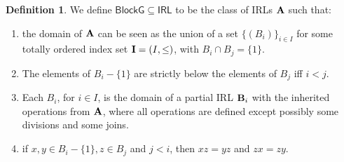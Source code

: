 \documentclass{amsart}
\theoremstyle{definition}
\newtheorem{definition}[theorem]{Definition}
\numberwithin{equation}{section}
\newcommand{\alg}[1]{{\textbf{\upshape #1}}}  %
\newcommand{\vv}[1]{\mathsf {#1}}
\newcommand{\sse}{\subseteq}
\newcommand{\BlG}{\vv{BlockG}}
\begin{document}
\begin{definition}\label{def:blockwiseclass}
	We define  $\BlG \sse \mathsf{IRL}$ to be the class of IRLs $\alg A$ such that:
\begin{enumerate}
	\item the domain of $\alg A$ can be seen as the union of a set $\{(B_i)\}_{i \in I}$ for some totally ordered index set ${\bf I} = (I, \leq)$, with $B_i \cap B_j = \{1\}$.
	\item The elements of $B_i- \{1\}$ are strictly below the elements of $B_j$ iff $i < j$.
	\item Each $B_i$, for $i \in I$, is the domain of a partial IRL $\alg B_i$ with the inherited operations from $\alg A$, where all operations are defined except possibly some divisions and some joins.
	\item if $x, y \in B_i- \{1\}, z \in B_j$ and $j < i$, then $xz = yz$ and $zx = zy$.
\end{enumerate} 

\end{definition}
\end{document}
